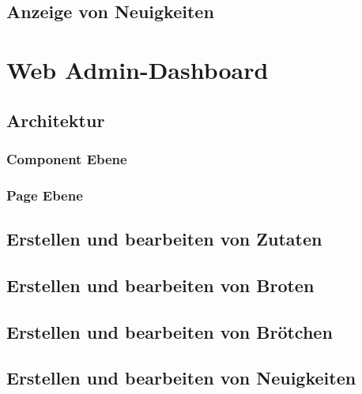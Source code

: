 \subsection{Anzeige von Neuigkeiten}

\clearpage

\section{Web Admin-Dashboard}

\subsection{Architektur}

\subsubsection{Component Ebene}

\clearpage

\subsubsection{Page Ebene}

\clearpage

\subsection{Erstellen und bearbeiten von Zutaten}

\clearpage

\subsection{Erstellen und bearbeiten von Broten}

\clearpage

\subsection{Erstellen und bearbeiten von Brötchen}

\clearpage

\subsection{Erstellen und bearbeiten von Neuigkeiten}

\clearpage